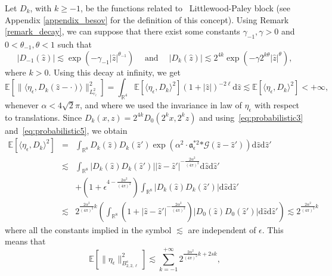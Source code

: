 \documentclass[a4paper,10pt]{article}
\newcommand{\asterisk}{\mathord{*}}
\newcommand{\mathd}{\mathrm{d}}
\newcommand{\tmop}[1]{\ensuremath{\operatorname{#1}}}
\begin{document}
Let $D_k$, with $k \geqslant - 1$, be the functions related to \
Littlewood-Paley block (see Appendix \ref{appendix_besov} for the definition
of this concept). Using Remark \ref{remark_decay}, we can suppose that there
exist some constants $\gamma_{- 1}, \gamma > 0$ and $0 < \theta_{- 1}, \theta
< 1$ such that
\[ | D_{- 1} (\hat{z}) | \lesssim \exp (- \gamma_{- 1} | \hat{z} |^{\theta_{-
   1}}) \quad \tmop{and} \quad | D_k (\hat{z}) | \lesssim 2^{4 k} \exp (-
   \gamma 2^{k \theta} | \hat{z} |^{\theta}), \]
where $k > 0$. Using this decay at infinity, we get
\[ \mathbb{E} [\| \langle \eta_{\epsilon}, D_k (\hat{z} - \cdot) \rangle
   \|_{L^2_{r_{\ell}}}^2] = \int_{\mathbb{R}^4} \mathbb{E} [\langle
   \eta_{\epsilon}, D_k \rangle^2] (1 + | \hat{z} |)^{- 2 \ell} \mathd \hat{z}
   \lesssim \mathbb{E} [\langle \eta_{\epsilon}, D_k \rangle^2] < + \infty, \]
whenever $\alpha < 4 \sqrt{2} \pi$, and where we used the invariance in law of
$\eta_{\epsilon}$ with respect to translations. Since $D_k (x, z) = 2^{4 k}
D_0 (2^k x, 2^k z)$ and using~{\eqref{eq:probabilistic3}}
and~{\eqref{eq:probabilistic5}}, we obtain
\begin{eqnarray}
  \mathbb{E} [\langle \eta_{\epsilon}, D_k \rangle^2] & = &
  \int_{\mathbb{R}^8} D_k (\hat{z}) D_k (\hat{z}') \exp (\alpha^2 \cdot
  \mathfrak{a}_{\epsilon}^{\asterisk 2} \asterisk \mathcal{G} (\hat{z} -
  \hat{z}')) \mathd \hat{z} \mathd \hat{z}' \nonumber\\
  & \lesssim & \int_{\mathbb{R}^8} | D_k (\hat{z}) D_k (\hat{z}') | | \hat{z}
  - \hat{z}' |^{- \frac{2 \alpha^2}{(4 \pi)^2}} \mathd \hat{z} \mathd \hat{z}'
   \nonumber\\
  &  & + \left( 1 + \epsilon^{4 - \frac{2 \alpha^2}{(4 \pi)^2}} \right)
  \int_{\mathbb{R}^8} | D_k (\hat{z}) D_k (\hat{z}') | \mathd \hat{z} \mathd
  \hat{z}'  \nonumber\\
  & \lesssim & 2^{\frac{2 \alpha^2}{(4 \pi)^2} k} \left( \int_{\mathbb{R}^8}
  \left( 1 + | \hat{z} - \hat{z}' |^{- \frac{2 \alpha^2}{(4 \pi)^2}} \right) |
  D_0 (\hat{z}) D_0 (\hat{z}') | \mathd \hat{z} \mathd \hat{z}' \right)
  \lesssim 2^{\frac{2 \alpha^2}{(4 \pi)^2} k}  \label{eq:eta1}
\end{eqnarray}
where all the constants implied in the symbol $\lesssim$ are independent of
$\epsilon$. This means that
\begin{equation}
  \mathbb{E} [\| \eta_{\epsilon} \|^2_{B^s_{2, 2, \ell}}] \lesssim \sum^{+
  \infty}_{k = - 1} 2^{\frac{2 \alpha^2}{(4 \pi)^2} k + 2 s k},
  \label{eq:eta2}
\end{equation}
\end{document}
